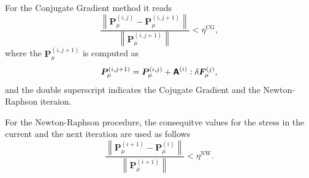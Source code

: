 For the Conjugate Gradient method it reads
\begin{equation}
\frac{\displaystyle{\left\|\bm P_\mu^{(i,j)}-\bm P_\mu^{(i,j+1)}\right\|}}{\displaystyle{\left\|\bm P_\mu^{(i,j+1)}\right\|}}<\eta^{\mathrm{CG}},
\end{equation}
where the \(\bm P_\mu^{(i,j+1)}\) is computed as
\begin{equation}
  \bm P_\mu^{(i,j+1)} = \bm P_\mu^{(i,j)}+ \boldsymbol{\mathsf{A}}^{(i)}: \delta \bm F_\mu^{(j)},
\end{equation}
and the double superscript indicates the Cojugate Gradient and the Newton-Raphson iteraion.

For the Newton-Raphson procedure, the consequitve values for the stress in the current and the next iteration are used as follows
\begin{equation}
\frac{\displaystyle{\left\|\bm P_\mu^{(i+1)}-\bm P_\mu^{(i)}\right\|}}{\displaystyle{\left\|\bm P_\mu^{(i+1)}\right\|}}<\eta^{\mathrm{NW}}.
\end{equation}

\newpage\null\thispagestyle{blank}\newpage
